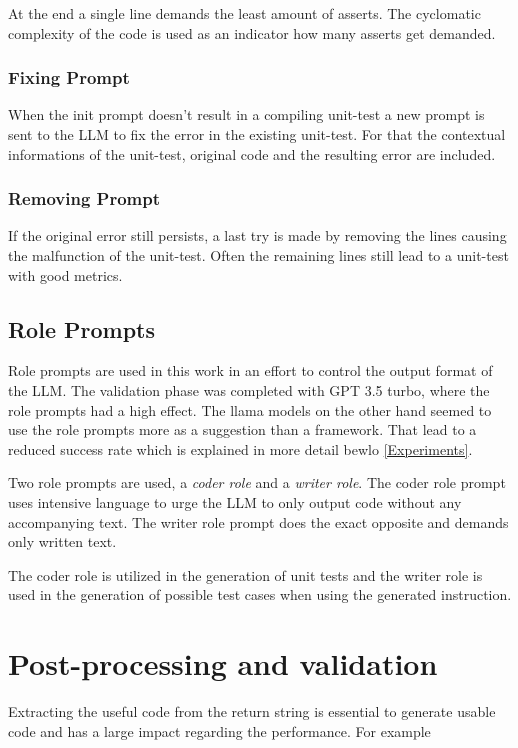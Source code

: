 \documentclass[a4paper,11pt,oneside]{memoir}
\begin{document}
At the end a single line demands the least amount of asserts. The cyclomatic complexity of the code is used as an indicator how many asserts get demanded. 

\subsubsection{Fixing Prompt}
When the init prompt doesn't result in a compiling unit-test a new prompt is sent to the LLM to fix the error in the existing unit-test. For that the contextual informations of the unit-test, original code and the resulting error are included. 

\subsubsection{Removing Prompt}
If the original error still persists, a last try is made by removing the lines causing the malfunction of the unit-test. Often the remaining lines still lead to a unit-test with good metrics.

\subsection{Role Prompts}
Role prompts are used in this work in an effort to control the output format of the LLM. The validation phase was completed with GPT 3.5 turbo, where the role prompts had a high effect. The llama models on the other hand seemed to use the role prompts more as a suggestion than a framework. That lead to a reduced success rate which is explained in more detail bewlo \ref{Experiments}.

Two role prompts are used, a \textit{coder role} and a \textit{writer role}. The coder role prompt uses intensive language to urge the LLM to only output code without any accompanying text. The writer role prompt does the exact opposite and demands only written text.

The coder role is utilized in the generation of unit tests and the writer role is used in the generation of possible test cases when using the generated instruction.
 
\section{Post-processing and validation}
Extracting the useful code from the return string is essential to generate usable code and has a large impact regarding the performance. For example 
\end{document}
